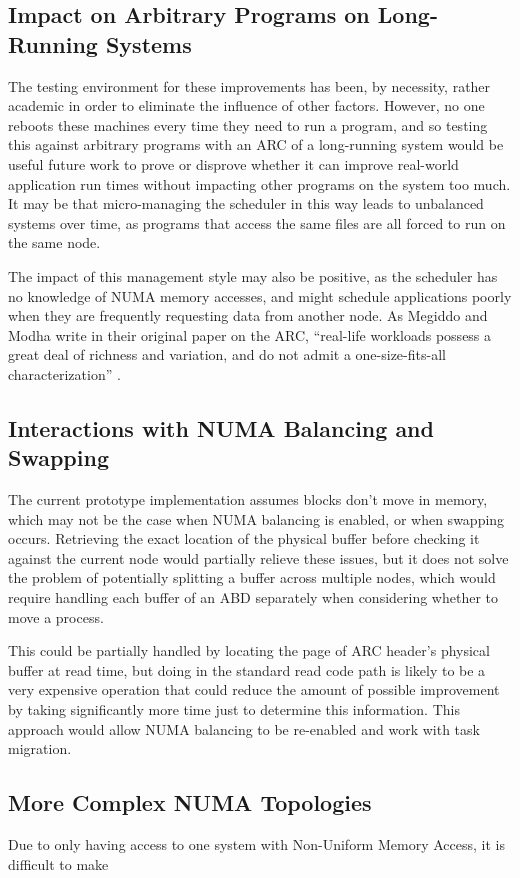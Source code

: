 \subsection{Impact on Arbitrary Programs on Long-Running Systems}
The testing environment for these improvements has been, by necessity, rather academic in order to eliminate the influence of other factors.
However, no one reboots these machines every time they need to run a program, and so testing this against arbitrary programs with 
an ARC of a long-running system would be useful future work to prove or disprove whether it can improve real-world application
run times without impacting other programs on the system too much.
It may be that micro-managing the scheduler in this way leads to unbalanced systems over time,
as programs that access the same files are all forced to run on the same node.

The impact of this management style may also be positive, as the scheduler has no knowledge of NUMA memory accesses, 
and might schedule applications poorly when they are frequently requesting data from another node.
As Megiddo and Modha write in their original paper on the ARC, ``real-life workloads possess a great deal of
richness and variation, and do not admit a one-size-fits-all characterization'' \cite{megiddo_dharmendra_ARC}.

\subsection{Interactions with NUMA Balancing and Swapping}
The current prototype implementation assumes blocks don't move in memory, 
which may not be the case when NUMA balancing is enabled, or when swapping occurs.
Retrieving the exact location of the physical buffer before checking it against the current node would partially relieve these issues, 
but it does not solve the problem of potentially splitting a buffer across multiple nodes, which would require handling
each buffer of an ABD separately when considering whether to move a process.

This could be partially handled by locating the page of ARC header's physical buffer at read time, but doing in the standard read code path is likely to be a very expensive operation 
that could reduce the amount of possible improvement by taking significantly more time just to determine this information.
This approach would allow NUMA balancing to be re-enabled and work with task migration.

\subsection{More Complex NUMA Topologies}
Due to only having access to one system with Non-Uniform Memory Access, it is difficult to make 

